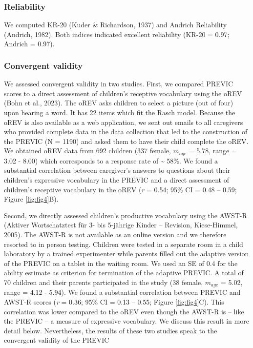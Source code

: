 \documentclass[
  man,floatsintext]{apa6}
\begin{document}
\hypertarget{reliability}{%
\subsubsection{Reliability}\label{reliability}}

We computed KR-20 (Kuder \& Richardson, 1937) and Andrich Reliability (Andrich, 1982). Both indices indicated excellent reliability (KR-20 = 0.97; Andrich = 0.97).

\hypertarget{convergent-validity}{%
\subsubsection{Convergent validity}\label{convergent-validity}}

We assessed convergent validity in two studies. First, we compared PREVIC scores to a direct assessment of children's receptive vocabulary using the oREV (Bohn et al., 2023). The oREV asks children to select a picture (out of four) upon hearing a word. It has 22 items which fit the Rasch model. Because the oREV is also available as a web application, we sent out emails to all caregivers who provided complete data in the data collection that led to the construction of the PREVIC (N = 1190) and asked them to have their child complete the oREV. We obtained oREV data from 692 children (337 female, \(m_{age}\) = 5.78, range = 3.02 - 8.00) which corresponds to a response rate of \textasciitilde{} 58\%. We found a substantial correlation between caregiver's answers to questions about their children's expressive vocabulary in the PREVIC and a direct assessment of children's receptive vocabulary in the oREV (\emph{r} = 0.54; 95\% CI = 0.48 -- 0.59; Figure \ref{fig:fig4}B).

Second, we directly assessed children's productive vocabulary using the AWST-R (Aktiver Wortschatztest für 3- bis 5-jährige Kinder -- Revision, Kiese-Himmel, 2005). The AWST-R is not available as an online version and we therefore resorted to in person testing. Children were tested in a separate room in a child laboratory by a trained experimenter while parents filled out the adaptive version of the PREVIC on a tablet in the waiting room. We used an SE of 0.4 for the ability estimate as criterion for termination of the adaptive PREVIC. A total of 70 children and their parents participated in the study (38 female, \(m_{age}\) = 5.02, range = 4.12 - 5.94). We found a substantial correlation between PREVIC and AWST-R scores (\emph{r} = 0.36; 95\% CI = 0.13 -- 0.55; Figure \ref{fig:fig4}C). This correlation was lower compared to the oREV even though the AWST-R is -- like the PREVIC -- a measure of expressive vocabulary. We discuss this result in more detail below. Nevertheless, the results of these two studies speak to the convergent validity of the PREVIC
\end{document}
